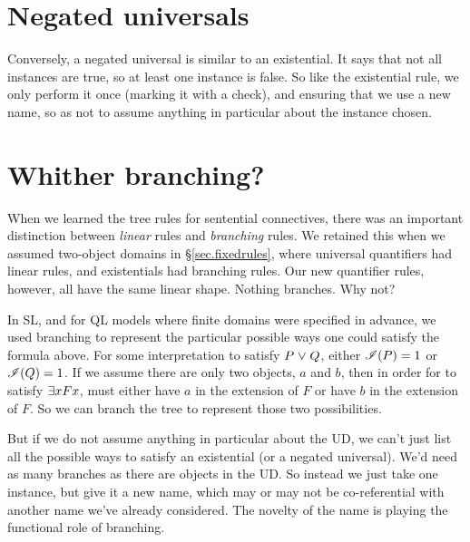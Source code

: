 \section{Negated universals}

Conversely, a negated universal is similar to an existential. It says that not all instances are true, so at least one instance is false. So like the existential rule, we only perform it once (marking it with a check), and ensuring that we use a new name, so as not to assume anything in particular about the instance chosen.

\label{negunrule}

\section{Whither branching?}

When we learned the tree rules for sentential connectives, there was an important distinction between \emph{linear} rules and \emph{branching} rules. We retained this when we assumed two-object domains in \S\ref{sec.fixedrules}, where universal quantifiers had linear rules, and existentials had branching rules. Our new quantifier rules, however, all have the same linear shape. Nothing branches. Why not?

In SL, and for QL models where finite domains were specified in advance, we used branching to represent the particular possible ways one could satisfy the formula above. For some interpretation  to satisfy $P \mkern1mu\vee\mkern1mu Q$, either $\mathscr{I}(P)=1$ or $\mathscr{I}(Q)=1$. If we assume there are only two objects, $a$ and $b$, then in order for  to satisfy $\exists x Fx$,  must either have $a$ in the extension of $F$ or have $b$ in the extension of $F$. So we can branch the tree to represent those two possibilities.

But if we do not assume anything in particular about the UD, we can't just list all the possible ways to satisfy an existential (or a negated universal). We'd need as many branches as there are objects in the UD. So instead we just take one instance, but give it a new name, which may or may not be co-referential with another name we've already considered. The novelty of the name is playing the functional role of branching.

